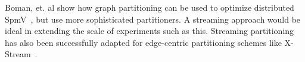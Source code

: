 Boman, et. al show how graph partitioning can be used to optimize distributed SpmV~\cite{Bomansc13}, but use more sophisticated partitioners. A streaming approach would be ideal in extending the scale of experiments such as this. 
Streaming partitioning has also been successfully adapted for edge-centric partitioning schemes like X-Stream~\cite{xstream}.

